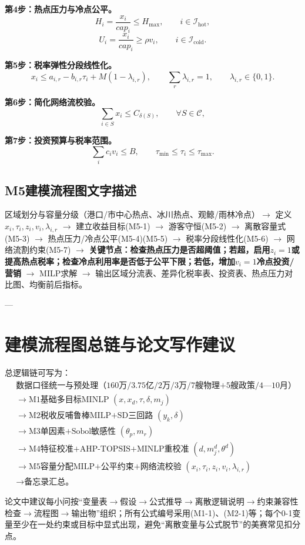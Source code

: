 \documentclass[UTF8,a4paper,12pt]{ctexart}
\begin{document}
\textbf{第4步：热点压力与冷点公平。}
\begin{equation}\tag{M5-4}
H_i=\frac{x_i}{cap_i}\le H_{\max},\qquad i\in\mathcal I_{\mathrm{hot}},
\end{equation}
\begin{equation}\tag{M5-5}
U_i=\frac{x_i}{cap_i}\ge \rho v_i,\qquad i\in\mathcal I_{\mathrm{cold}}.
\end{equation}

\textbf{第5步：税率弹性分段线性化。}
\begin{equation}\tag{M5-6}
x_i\le a_{i,r}-b_{i,r}\tau_i+M(1-\lambda_{i,r}),\qquad \sum_r\lambda_{i,r}=1,\qquad \lambda_{i,r}\in\{0,1\}.
\end{equation}

\textbf{第6步：简化网络流校验。}
\begin{equation}\tag{M5-7}
\sum_{i\in S}x_i\le C_{\delta(S)},\qquad \forall S\in\mathcal C,
\end{equation}

\textbf{第7步：投资预算与税率范围。}
\begin{equation}\tag{M5-8}
\sum_i c_i v_i\le B,\qquad \tau_{\min}\le\tau_i\le\tau_{\max}.
\end{equation}

\subsection{M5建模流程图文字描述}

区域划分与容量分级（港口/市中心热点、冰川热点、观鲸/雨林冷点）\(\rightarrow\) 定义\(x_i,\tau_i,z_i,v_i,\lambda_{i,r}\) \(\rightarrow\) 建立收益目标(M5-1) \(\rightarrow\) 游客守恒(M5-2) \(\rightarrow\) 离散容量式(M5-3) \(\rightarrow\) 热点压力/冷点公平(M5-4)(M5-5) \(\rightarrow\) 税率分段线性化(M5-6) \(\rightarrow\) 网络流割约束(M5-7) \(\rightarrow\) \textbf{关键节点：检查热点压力是否超阈值；若超，启用\(z_i=1\)或提高热点税率；检查冷点利用率是否低于公平下限；若低，增加\(v_i=1\)冷点投资/营销} \(\rightarrow\) MILP求解 \(\rightarrow\) 输出区域分流表、差异化税率表、投资表、热点压力对比图、均衡前后指标。

---

\section{建模流程图总链与论文写作建议}

总逻辑链可写为：
\[
\begin{aligned}
&\text{数据口径统一与预处理（160万/3.75亿/2万/3万/7艘物理+5艘政策/4—10月）}\\
&\rightarrow \text{M1基础多目标MINLP }(x,x_d,\tau,\delta,m_j)\\
&\rightarrow \text{M2税收反哺鲁棒MILP+SD三回路 }(y_k,\delta)\\
&\rightarrow \text{M3单因素+Sobol敏感性 }(\theta_p,m_r)\\
&\rightarrow \text{M4特征校准+AHP-TOPSIS+MINLP重校准 }(d,m_j^d,\theta^d)\\
&\rightarrow \text{M5容量分配MILP+公平约束+网络流校验 }(x_i,\tau_i,z_i,v_i,\lambda_{i,r})\\
&\rightarrow \text{备忘录汇总。}
\end{aligned}
\]

论文中建议每小问按“变量表\(\rightarrow\)假设\(\rightarrow\)公式推导\(\rightarrow\)离散逻辑说明\(\rightarrow\)约束兼容性检查\(\rightarrow\)流程图\(\rightarrow\)输出物”组织；所有公式编号采用(M1-1)、(M2-1)等；每个0-1变量至少在一处约束或目标中显式出现，避免“离散变量与公式脱节”的美赛常见扣分点。
\end{document}
